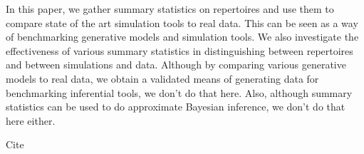 \documentclass{article}
\begin{document}
In this paper, we gather summary statistics on repertoires and use them to compare state of the art simulation tools to real data.
This can be seen as a way of benchmarking generative models and simulation tools.
We also investigate the effectiveness of various summary statistics in distinguishing between repertoires and between simulations and data.
Although by comparing various generative models to real data, we obtain a validated means of generating data for benchmarking inferential tools, we don't do that here.
Also, although summary statistics can be used to do approximate Bayesian inference, we don't do that here either.


Cite \cite{Felsenstein1981-zs}



\end{document}
